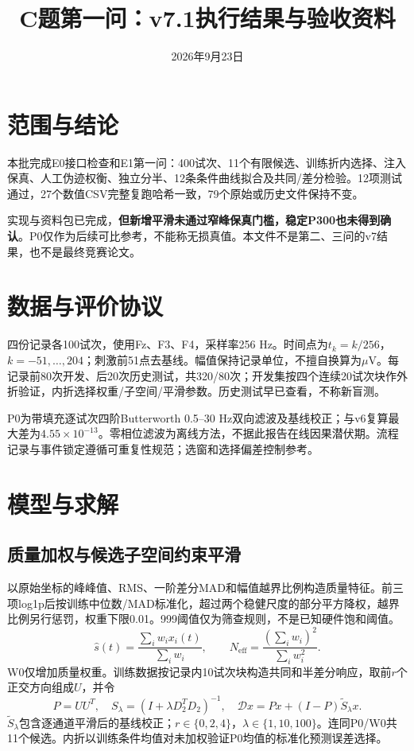 \documentclass[UTF8,a4paper,11pt,fontset=fandol]{ctexart}
\title{C题第一问：v7.1执行结果与验收资料}
\author{}
\date{2026年9月23日}
\begin{document}
\maketitle
\section{范围与结论}
本批完成E0接口检查和E1第一问：400试次、11个有限候选、训练折内选择、注入保真、人工伪迹权衡、独立分半、12条条件曲线拟合及共同/差分检验。12项测试通过，27个数值CSV完整复跑哈希一致，79个原始或历史文件保持不变。

实现与资料包已完成，\textbf{但新增平滑未通过窄峰保真门槛，稳定P300也未得到确认}。P0仅作为后续可比参考，不能称无损真值。本文件不是第二、三问的v7结果，也不是最终竞赛论文。

\section{数据与评价协议}
四份记录各100试次，使用Fz、F3、F4，采样率256 Hz。时间点为$t_k=k/256$，$k=-51,\ldots,204$；刺激前51点去基线。幅值保持记录单位，不擅自换算为$\mu\mathrm V$。每记录前80次开发、后20次历史测试，共320/80次；开发集按四个连续20试次块作外折验证，内折选择权重/子空间/平滑参数。历史测试早已查看，不称新盲测。

P0为带填充逐试次四阶Butterworth 0.5--30 Hz双向滤波及基线校正；与v6复算最大差为$4.55\times10^{-13}$。零相位滤波为离线方法，不据此报告在线因果潜伏期。流程记录与事件锁定遵循可重复性规范\cite{pernet2020cobidas}；选窗和选择偏差控制参考\cite{luck2017erp,kriegeskorte2009circular}。

\section{模型与求解}
\subsection{质量加权与候选子空间约束平滑}
以原始坐标的峰峰值、RMS、一阶差分MAD和幅值越界比例构造质量特征。前三项log1p后按训练中位数/MAD标准化，超过两个稳健尺度的部分平方降权，越界比例另行惩罚，权重下限0.01。999阈值仅为筛查规则，不是已知硬件饱和阈值。
\[
\widehat s(t)=\frac{\sum_iw_ix_i(t)}{\sum_iw_i},\qquad
N_{\mathrm{eff}}=\frac{(\sum_iw_i)^2}{\sum_iw_i^2}.
\]
W0仅增加质量权重。训练数据按记录内10试次块构造共同和半差分响应，取前$r$个正交方向组成$U$，并令
\[
P=UU^T,\quad S_\lambda=(I+\lambda D_2^TD_2)^{-1},\quad
\mathcal D x=Px+(I-P)\widetilde S_\lambda x.
\]
$\widetilde S_\lambda$包含逐通道平滑后的基线校正；$r\in\{0,2,4\}$，$\lambda\in\{1,10,100\}$。连同P0/W0共11个候选。内折以训练条件均值对未加权验证P0均值的标准化预测误差选择。
\end{document}
